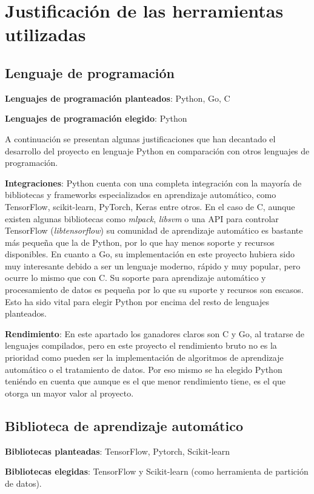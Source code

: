 \section{Justificación de las herramientas utilizadas}

\subsection{Lenguaje de programación}
\textbf{Lenguajes de programación planteados}: Python, Go, C

\textbf{Lenguajes de programación elegido}: Python

A continuación se presentan algunas justificaciones que han decantado el desarrollo del proyecto en lenguaje Python en comparación con otros lenguajes de programación.

\textbf{Integraciones}: Python cuenta con una completa integración con la mayoría de bibliotecas y frameworks especializados en aprendizaje automático, como TensorFlow, scikit-learn, PyTorch, Keras entre otros. 
En el caso de C, aunque existen algunas bibliotecas como \textit{mlpack}, \textit{libsvm} o una API para controlar TensorFlow (\textit{libtensorflow}) su comunidad de aprendizaje automático es bastante más pequeña que la de Python, por lo que hay menos soporte y recursos disponibles.
En cuanto a Go, su implementación en este proyecto hubiera sido muy interesante debido a ser un lenguaje moderno, rápido y muy popular, pero ocurre lo mismo que con C. Su soporte para aprendizaje automático y procesamiento de datos es pequeña por lo que su suporte y recursos son escasos.
Esto ha sido vital para elegir Python por encima del resto de lenguajes planteados.

\textbf{Rendimiento}: En este apartado los ganadores claros son C y Go, al tratarse de lenguajes compilados, pero en este proyecto el rendimiento bruto no es la prioridad como pueden ser la implementación de algoritmos de aprendizaje automático o el tratamiento de datos.
Por eso mismo se ha elegido Python teniéndo en cuenta que aunque es el que menor rendimiento tiene, es el que otorga un mayor valor al proyecto.

\subsection{Biblioteca de aprendizaje automático}
\textbf{Bibliotecas planteadas}: TensorFlow, Pytorch, Scikit-learn

\textbf{Bibliotecas elegidas}: TensorFlow y Scikit-learn (como herramienta de partición de datos).

